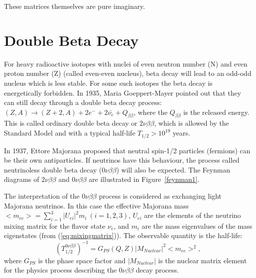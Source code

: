 These matrices themselves are pure imaginary. 


\section{Double Beta Decay}

For heavy radioactive isotopes with nuclei of even neutron number (N) and even proton number (Z) (called even-even nucleus), beta decay will lead to an odd-odd nucleus which is less stable. For some such isotopes the beta decay is energetically forbidden. In 1935, Maria Goeppert-Mayer pointed out that they can still decay through a double beta decay process: $(Z,A) \to (Z+2,A)+2e^{-}+2\bar{\nu_e}+Q_{\beta\beta}$, where the $Q_{\beta\beta}$ is the released energy. This is called ordinary double beta decay or $2\nu\beta\beta$, which is allowed by the Standard Model and with a typical half-life $T_{1/2}>10^{19}$ years\cite{martin}.

In 1937, Ettore Majorana proposed that neutral spin-1/2 particles (fermions) can be their own antiparticles\cite{majorana}. If neutrinos have this behaviour, the process called neutrinoless double beta decay ($0\nu\beta\beta$) will also be expected. The Feynman diagrams of $2\nu\beta\beta$ and $0\nu\beta\beta$ are illustrated in Figure~\ref{feynman1}.


The interpretation of the $0\nu\beta\beta$ process is considered as exchanging light Majorana neutrinos. In this case the effective Majorana mass $<m_{ee}>=\sum_{i=1}^{3} |U_{ei}|^2m_i~(i=1,2,3)$, $U_{ei}$ are the elements of the neutrino mixing matrix for the flavor state $\nu_e$, and $m_i$ are the mass eigenvalues of the mass eigenstates (from (\ref{eq:mixingmatrix})). The observable quantity is the half-life:
\[
(T^{0\nu\beta\beta}_{1/2})^{-1} = G_{PS}(Q,Z)|M_{Nuclear}|^2<m_{ee}>^2, 
\]
where $G_{PS}$ is the phase space factor and $|M_{Nuclear}|$ is the nuclear matrix element for the physics process describing the $0\nu\beta\beta$ decay process\cite{kaizuber}.








